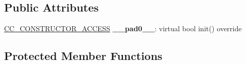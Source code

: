 \subsection*{Public Attributes}
\begin{DoxyCompactItemize}
\item 
\mbox{\label{classui_1_1ListView_affb51de4a87ccfab4185cda7c2b669e6}} 
\hyperlink{_2cocos2d_2cocos_2base_2ccConfig_8h_a25ef1314f97c35a2ed3d029b0ead6da0}{C\+C\+\_\+\+C\+O\+N\+S\+T\+R\+U\+C\+T\+O\+R\+\_\+\+A\+C\+C\+E\+SS} {\bfseries \+\_\+\+\_\+pad0\+\_\+\+\_\+}\+: virtual bool init() override
\end{DoxyCompactItemize}
\subsection*{Protected Member Functions}
